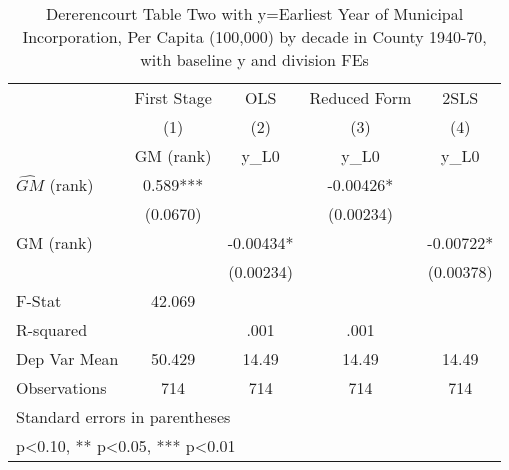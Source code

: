\begin{table}[htbp]\centering
\def\sym#1{\ifmmode^{#1}\else\(^{#1}\)\fi}
\caption{Dererencourt Table Two with y=Earliest Year of Municipal Incorporation, Per Capita (100,000) by decade in County 1940-70, with baseline y and division FEs}
\begin{tabular}{l*{4}{c}}
\toprule
                    & First Stage   &         OLS   &Reduced Form   &        2SLS   \\
                    &\multicolumn{1}{c}{(1)}&\multicolumn{1}{c}{(2)}&\multicolumn{1}{c}{(3)}&\multicolumn{1}{c}{(4)}\\
                    &\multicolumn{1}{c}{GM  (rank)}&\multicolumn{1}{c}{y\_L0}&\multicolumn{1}{c}{y\_L0}&\multicolumn{1}{c}{y\_L0}\\
\midrule
$\hat{GM}$ (rank)   &       0.589***&               &    -0.00426*  &               \\
                    &    (0.0670)   &               &   (0.00234)   &               \\
\addlinespace
GM  (rank)          &               &    -0.00434*  &               &    -0.00722*  \\
                    &               &   (0.00234)   &               &   (0.00378)   \\
\midrule
F-Stat              &      42.069   &               &               &               \\
R-squared           &               &        .001   &        .001   &               \\
Dep Var Mean        &      50.429   &       14.49   &       14.49   &       14.49   \\
Observations        &         714   &         714   &         714   &         714   \\
\bottomrule
\multicolumn{5}{l}{\footnotesize Standard errors in parentheses}\\
\multicolumn{5}{l}{\footnotesize * p<0.10, ** p<0.05, *** p<0.01}\\
\end{tabular}
\end{table}
